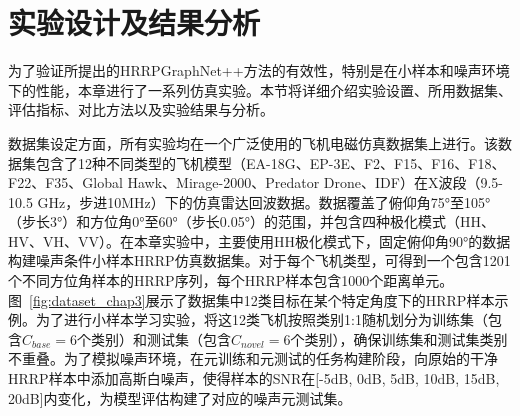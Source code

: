 \section{实验设计及结果分析}
\label{sec:noise_experiments}

为了验证所提出的HRRPGraphNet++方法的有效性，特别是在小样本和噪声环境下的性能，本章进行了一系列仿真实验。本节将详细介绍实验设置、所用数据集、评估指标、对比方法以及实验结果与分析。

数据集设定方面，所有实验均在一个广泛使用的飞机电磁仿真数据集上进行。该数据集包含了12种不同类型的飞机模型（EA-18G、EP-3E、F2、F15、F16、F18、F22、F35、Global Hawk、Mirage-2000、Predator Drone、IDF）在X波段（9.5-10.5 GHz，步进10MHz）下的仿真雷达回波数据。数据覆盖了俯仰角75°至105°（步长3°）和方位角0°至60°（步长0.05°）的范围，并包含四种极化模式（HH、HV、VH、VV）。在本章实验中，主要使用HH极化模式下，固定俯仰角90°的数据构建噪声条件小样本HRRP仿真数据集。对于每个飞机类型，可得到一个包含1201个不同方位角样本的HRRP序列，每个HRRP样本包含1000个距离单元。图~\ref{fig:dataset_chap3}展示了数据集中12类目标在某个特定角度下的HRRP样本示例。为了进行小样本学习实验，将这12类飞机按照类别1:1随机划分为训练集（包含$C_{base}=6$个类别）和测试集（包含$C_{novel}=6$个类别），确保训练集和测试集类别不重叠。为了模拟噪声环境，在元训练和元测试的任务构建阶段，向原始的干净HRRP样本中添加高斯白噪声，使得样本的SNR在[-5dB, 0dB, 5dB, 10dB, 15dB, 20dB]内变化，为模型评估构建了对应的噪声元测试集。

